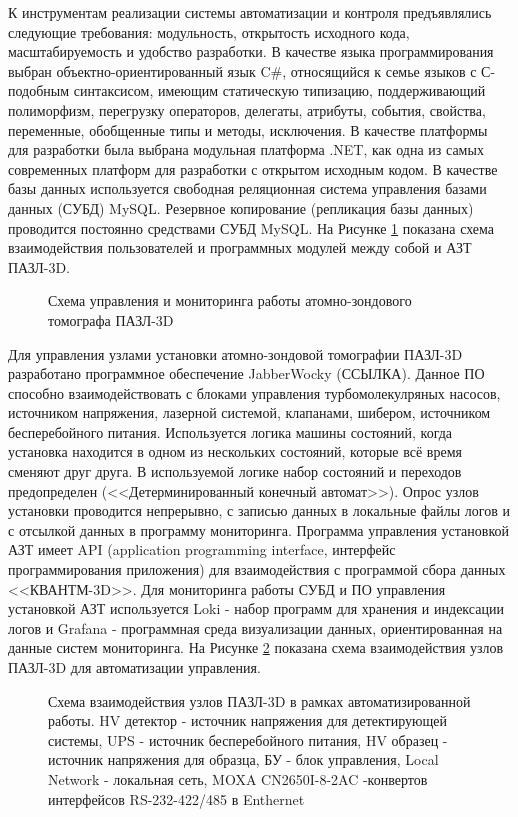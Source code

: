 К инструментам реализации системы автоматизации и контроля предъявлялись следующие требования: модульность, открытость исходного кода, масштабируемость и удобство разработки. В качестве языка программирования выбран объектно-ориентированный язык C$\#$, относящийся к семье языков с С-подобным синтаксисом, имеющим статическую типизацию, поддерживающий полиморфизм, перегрузку операторов, делегаты, атрибуты, события, свойства, переменные, обобщенные типы и методы, исключения. В качестве платформы для разработки была выбрана модульная платформа .NET, как одна из самых современных платформ для разработки с открытом исходным кодом. В качестве базы данных используется свободная реляционная система управления базами данных (СУБД) MySQL. Резервное копирование (репликация базы данных) проводится постоянно средствами СУБД MySQL. На Рисунке \cref{fig:auto_APPLE_manage}  показана схема взаимодействия пользователей и программных модулей между собой и АЗТ ПАЗЛ-3D.

\begin{figure}[htb]
	\caption{Схема управления и мониторинга работы атомно-зондового томографа ПАЗЛ-3D}
	\label{fig:auto_APPLE_manage}
\end{figure}

Для управления узлами установки атомно-зондовой томографии ПАЗЛ-3D разработано программное обеспечение JabberWocky (ССЫЛКА). Данное ПО способно взаимодействовать с блоками управления турбомолекулряных насосов, источником напряжения, лазерной системой, клапанами, шибером, источником бесперебойного питания. Используется логика машины состояний, когда установка находится в одном из нескольких состояний, которые всё время сменяют друг друга. В используемой логике набор состояний и переходов предопределен (<<Детерминированный конечный автомат>>). Опрос узлов установки проводится непрерывно, с записью данных в локальные файлы логов и с отсылкой данных в программу мониторинга. Программа управления установкой АЗТ имеет API (application programming interface, интерфейс программирования приложения) для взаимодействия с программой сбора данных <<КВАНТМ-3D>>. Для мониторинга работы СУБД и ПО управления установкой АЗТ используется Loki - набор программ для хранения и индексации логов и Grafana - программная среда визуализации данных, ориентированная на данные систем мониторинга. На Рисунке \cref{fig:auto_APPLE_scheme} показана схема взаимодействия узлов ПАЗЛ-3D для автоматизации управления.

\begin{figure}[htb]
	\caption{Схема взаимодействия узлов ПАЗЛ-3D в рамках автоматизированной работы. HV детектор - источник напряжения для детектирующей системы, UPS - источник бесперебойного питания, HV образец - источник напряжения для образца, БУ - блок управления, Local Network - локальная сеть, MOXA CN2650I-8-2AC -конвертов интерфейсов RS-232-422/485 в Enthernet}
	\label{fig:auto_APPLE_scheme}
\end{figure}

